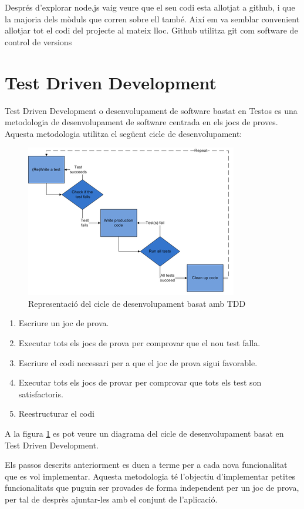 Després d'explorar node.js vaig veure que el seu codi esta allotjat a github, i que la majoria dels mòduls que corren sobre ell també. Així em va semblar convenient allotjar tot el codi del projecte al mateix lloc. Github utilitza git com software de control de versions

\section{Test Driven Development}

Test Driven Development o desenvolupament de software bastat en Testos es una metodologia de desenvolupament de software centrada en els jocs de proves. Aquesta metodologia utilitza el següent cicle de desenvolupament: 

\begin{figure}[htbp]
\centering\includegraphics{img/test-driven-development.png}
\caption{Representació del cicle de desenvolupament basat amb TDD}
\label{fig:tdd}
\end{figure} 

\begin{enumerate}
    \item{Escriure un joc de prova.}
    \item{Executar tots els jocs de prova per comprovar que el nou test falla.}
    \item{Escriure el codi necessari per a que el joc de prova sigui favorable.}
    \item{Executar tots els jocs de provar per comprovar que tots els test son satisfactoris.}
    \item{Reestructurar el codi}
\end{enumerate}

A la figura \ref{fig:tdd} es pot veure un diagrama del cicle de desenvolupament basat en Test Driven Development.

Els passos descrits anteriorment es duen a terme per a cada nova funcionalitat que es vol implementar. Aquesta metodologia té l'objectiu d'implementar petites funcionalitats que puguin ser provades de forma independent per un joc de prova, per tal de desprès ajuntar-les amb el conjunt de l'aplicació. 

